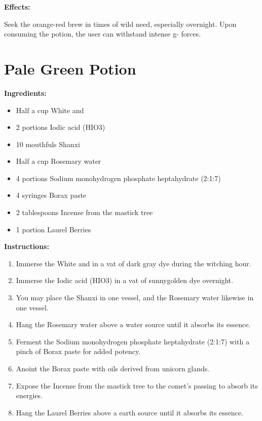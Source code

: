 \documentclass{article}
\begin{document}
\textbf{Effects:}

Seek the orange-red brew in times of wild need, especially overnight. Upon consuming the potion, the user can withstand intense g- forces.

\newpage
\section*{Pale Green Potion}

\textbf{Ingredients:}

\begin{itemize}
  \item Half a cup White and
  \item 2 portions Iodic acid  (HIO3)
  \item 10 mouthfuls Shanxi
  \item Half a cup Rosemary water
  \item 4 portions Sodium monohydrogen phosphate heptahydrate (2:1:7)
  \item 4 syringes Borax paste
  \item 2 tablespoons Incense from the mastick tree
  \item 1 portion Laurel Berries
\end{itemize}

\textbf{Instructions:}

\begin{enumerate}
  \item Immerse the White and in a vat of dark gray dye during the witching hour.
  \item Immerse the Iodic acid  (HIO3) in a vat of sunnygolden dye overnight.
  \item You may place the Shanxi in one vessel, and the Rosemary water likewise in one vessel.
  \item Hang the Rosemary water above a water source until it absorbs its essence.
  \item Ferment the Sodium monohydrogen phosphate heptahydrate (2:1:7) with a pinch of Borax paste for added potency.
  \item Anoint the Borax paste with oils derived from unicorn glands.
  \item Expose the Incense from the mastick tree to the comet’s passing to absorb its energies.
  \item Hang the Laurel Berries above a earth source until it absorbs its essence.
\end{enumerate}
\end{document}
